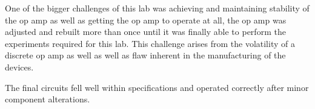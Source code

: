 One of the bigger challenges of this lab was achieving and maintaining stability of the op amp as well as getting the op amp to operate at all, the op amp was adjusted and rebuilt more than once until it was finally able to perform the experiments required for this lab. This challenge arises from the volatility of a discrete op amp as well as well as flaw inherent in the manufacturing of the devices.

The final circuits fell well within specifications and operated correctly after minor component alterations.




